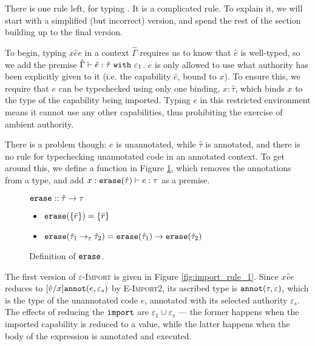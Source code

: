 There is one rule left, for typing . It is a complicated rule. To
explain it, we will start with a simplified (but incorrect) version, and spend the
rest of the section building up to the final version.


To begin, typing ${x}{\hat e}{e}$ in a context
$\hat \Gamma$ requires us to know that $\hat e$ is
well-typed, so we add the premise
$\hat \Gamma \vdash \hat e: \hat \tau~\mathtt{with}~ \varepsilon_1$.
$e$ is only allowed to use what authority has been explicitly given to it
(i.e. the capability $\hat e$, bound to $x$). To ensure this, we require
that $e$ can be typechecked using only one binding, $x: \hat \tau$,
which binds $x$ to the type of the capability being imported.
Typing $e$ in this restricted environment means it cannot use any
other capabilities, thus prohibiting the exercise of ambient authority.

There is a problem though: $e$ is unannotated, while $\hat \tau$ is
annotated, and there is no rule for typechecking unannotated code in
an annotated context. To get around this, we define a function
 in Figure \ref{fig:erase_defn}, which removes the
annotations from a type, and add
$x: \mathtt{erase}(\hat \tau) \vdash e: \tau$ as a premise.


\begin{figure}
\vspace{-0.2cm}
$\mathtt{erase} :: \hat \tau \rightarrow \tau$
\begin{itemize}
	\setlength\itemsep{-0.2em}
	\item[] $\mathtt{erase}(\{ \bar r \}) = \{ \bar r \}$
	\item[] $\mathtt{erase}(\hat \tau_1 \rightarrow_{\varepsilon} \hat \tau_2) = \mathtt{erase}(\hat \tau_1) \rightarrow \mathtt{erase}(\hat \tau_2)$
\end{itemize}


\vspace{-0.5cm}
\caption{Definition of $\mathtt{erase}$.}
\vspace{-0.5cm}
\label{fig:erase_defn}
\end{figure}

The first version of \textsc{$\varepsilon$-Import} is given in Figure
\ref{fig:import_rule_1}. Since
${x}{\hat v}{e}$ reduces to $[\hat
v/x]\mathtt{annot}(e, \varepsilon_s)$ by \textsc{E-Import2}, its ascribed type is $\mathtt{annot}(\tau, \varepsilon)$, which is the type of the unannotated
code $e$, annotated with its selected authority $\varepsilon_s$. The
effects of reducing the $\mathtt{import}$ are $\varepsilon_1 \cup \varepsilon_s$
--- the former happens when the imported capability is reduced to a value,
while the latter happens when the body of the  expression is
annotated and executed.

